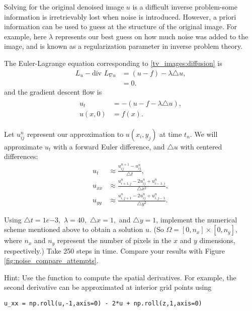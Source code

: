 Solving for the original denoised image $u$ is a difficult inverse problem-some information is irretrievably lost when noise is introduced. However, a priori information can be used to guess at the structure of the original image.  For example, here $\lambda$ represents our best guess on how much noise was added to the image, and is known as a regularization parameter in inverse problem theory. 

The Euler-Lagrange equation corresponding to \eqref{tv_images:diffusion} is
\begin{align*}
L_u - \text{div } L_{\nabla u} &= (u-f) - \lambda \triangle u,\\
&= 0.
\end{align*}
and the gradient descent flow is 
\begin{align}
	\begin{split}
u_t &= -(u-f -\lambda \triangle u),\\
u(x,0) &= f(x).	
	\end{split} \label{tv_images:diffusion_flow}
\end{align}

Let $u_{ij}^n$ represent our approximation to $u(x_i,y_j)$ at time $t_n$. We will approximate $u_t$ with a forward Euler difference, and $\triangle u$ with centered differences: 
\begin{align*}
	u_t &\approx \frac{u_{ij}^{n+1}-u_{ij}^n}{\triangle t},\\
	u_{xx} &\approx \frac{u_{i+1,j}^{n}-2u_{ij}^n + u_{i-1,j}^n}{\triangle x^2}, \\
	u_{yy} &\approx \frac{u_{i,j+1}^{n}-2u_{ij}^n + u_{i,j-1}^n}{\triangle y^2}.
\end{align*}


\begin{problem}
Using $\triangle t = 1e{-3},$ $\lambda = 40,$ $\triangle x = 1,$ and $\triangle y = 1$, implement the numerical scheme mentioned above to obtain a solution $u$. (So $\Omega = [0,n_x]\times [0,n_y]$, where $n_x$ and $n_y$ represent the number of pixels in the $x$ and $y$ dimensions, respectively.) Take 250 steps in time. Compare your results with Figure \ref{fig:noise_compare_attempts}.

Hint: Use the function  to compute the spatial derivatives. For example, the second derivative can be approximated at interior grid points using 
\begin{lstlisting}
u_xx = np.roll(u,-1,axis=0) - 2*u + np.roll(z,1,axis=0)	
\end{lstlisting}
\end{problem}




